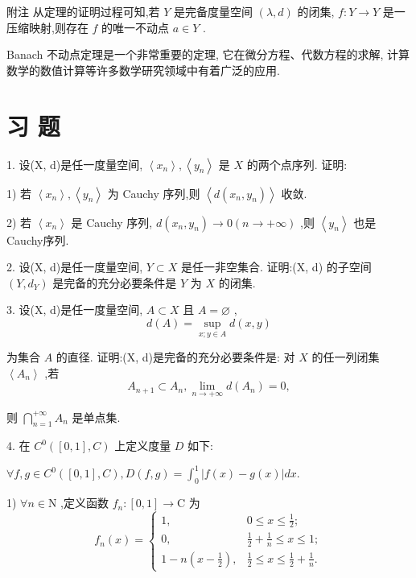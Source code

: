 附注 从定理的证明过程可知,若 $Y$ 是完备度量空间 $\left( {\lambda ,d}\right)$ 的闭集, $f : Y \rightarrow  Y$ 是一压缩映射,则存在 $f$ 的唯一不动点 $a \in  Y$ .

Banach 不动点定理是一个非常重要的定理, 它在微分方程、代数方程的求解, 计算数学的数值计算等许多数学研究领域中有着广泛的应用.

\section*{习 题}

1. 设(X, d)是任一度量空间, $\left\langle  {x}_{n}\right\rangle  ,\left\langle  {y}_{n}\right\rangle$ 是 $X$ 的两个点序列. 证明:

1) 若 $\left\langle  {x}_{n}\right\rangle  ,\left\langle  {y}_{n}\right\rangle$ 为 Cauchy 序列,则 $\left\langle  {d\left( {{x}_{n},{y}_{n}}\right) }\right\rangle$ 收敛.

2) 若 $\left\langle  {x}_{n}\right\rangle$ 是 Cauchy 序列, $d\left( {{x}_{n},{y}_{n}}\right)  \rightarrow  0\left( {n \rightarrow   + \infty }\right)$ ,则 $\left\langle  {y}_{n}\right\rangle$ 也是 Cauchy序列.

2. 设(X, d)是任一度量空间, $Y \subset  X$ 是任一非空集合. 证明:(X, d) 的子空间 $\left( {Y,{d}_{Y}}\right)$ 是完备的充分必要条件是 $Y$ 为 $X$ 的闭集.

3. 设(X, d)是任一度量空间, $A \subset  X$ 且 $A = \varnothing$ ,
$$d\left( A\right)  = \mathop{\sup }\limits_{{x;y \in  A}}d\left( {x,y}\right)$$

为集合 $A$ 的直径. 证明:(X, d)是完备的充分必要条件是: 对 $X$ 的任一列闭集 $\left\langle  {A}_{n}\right\rangle$ ,若
$${A}_{n + 1} \subset  {A}_{n},\mathop{\lim }\limits_{{n \rightarrow   + \infty }}d\left( {A}_{n}\right)  = 0,$$

则 $\mathop{\bigcap }\limits_{{n = 1}}^{{+\infty }}{A}_{n}$ 是单点集.

4. 在 ${C}^{0}\left( {\left\lbrack  {0,1}\right\rbrack  ,C}\right)$ 上定义度量 $D$ 如下:

$\forall f,g \in  {C}^{0}\left( {\left\lbrack  {0,1}\right\rbrack  ,C}\right) ,D\left( {f,g}\right)  = {\int }_{0}^{1}\left| {f\left( x\right)  - g\left( x\right) }\right| {dx}.$

1) $\forall n \in  \mathrm{N}$ ,定义函数 ${f}_{n} : \left\lbrack  {0,1}\right\rbrack   \rightarrow  \mathrm{C}$ 为
$${f}_{n}\left( x\right)  = \left\{  \begin{array}{ll} 1, & 0 \leq  x \leq  \frac{1}{2}; \\  0, & \frac{1}{2} + \frac{1}{n} \leq  x \leq  1; \\  1 - n\left( {x - \frac{1}{2}}\right) , & \frac{1}{2} \leq  x \leq  \frac{1}{2} + \frac{1}{n}. \end{array}\right.$$

